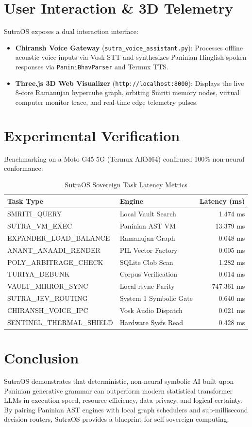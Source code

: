 \documentclass[10pt,journal,compsoc]{IEEEtran}
\begin{document}
\section{User Interaction \& 3D Telemetry}
SutraOS exposes a dual interaction interface:
\begin{itemize}
    \item \textbf{Chiransh Voice Gateway} (\texttt{sutra\_voice_assistant.py}): Processes offline acoustic voice inputs via Vosk STT and synthesizes Paninian Hinglish spoken responses via \texttt{PaniniBhavParser} and Termux TTS.
    \item \textbf{Three.js 3D Web Visualizer} (\texttt{http://localhost:8000}): Displays the live 8-core Ramanujan hypercube graph, orbiting Smriti memory nodes, virtual computer monitor trace, and real-time edge telemetry pulses.
\end{itemize}

\section{Experimental Verification}
Benchmarking on a Moto G45 5G (Termux ARM64) confirmed 100\% non-neural conformance:
\begin{table}[h]
\centering
\caption{SutraOS Sovereign Task Latency Metrics}
\begin{tabular}{llr}
\toprule
\textbf{Task Type} & \textbf{Engine} & \textbf{Latency (ms)} \\
\midrule
SMRITI\_QUERY & Local Vault Search & 1.474 ms \\
SUTRA\_VM\_EXEC & Paninian AST VM & 13.379 ms \\
EXPANDER\_LOAD\_BALANCE & Ramanujan Graph & 0.048 ms \\
ANANT\_ANAADI\_RENDER & PIL Vector Factory & 0.005 ms \\
POLY\_ARBITRAGE\_CHECK & SQLite Clob Scan & 1.282 ms \\
TURIYA\_DEBUNK & Corpus Verification & 0.014 ms \\
VAULT\_MIRROR\_SYNC & Local rsync Parity & 747.361 ms \\
SUTRA\_JEV\_ROUTING & System 1 Symbolic Gate & 0.640 ms \\
CHIRANSH\_VOICE\_IPC & Vosk Audio Dispatch & 0.021 ms \\
SENTINEL\_THERMAL\_SHIELD & Hardware Sysfs Read & 0.428 ms \\
\bottomrule
\end{tabular}
\end{table}

\section{Conclusion}
SutraOS demonstrates that deterministic, non-neural symbolic AI built upon Paninian generative grammar can outperform modern statistical transformer LLMs in execution speed, resource efficiency, data privacy, and logical certainty. By pairing Paninian AST engines with local graph schedulers and sub-millisecond decision routers, SutraOS provides a blueprint for self-sovereign computing.
\end{document}
